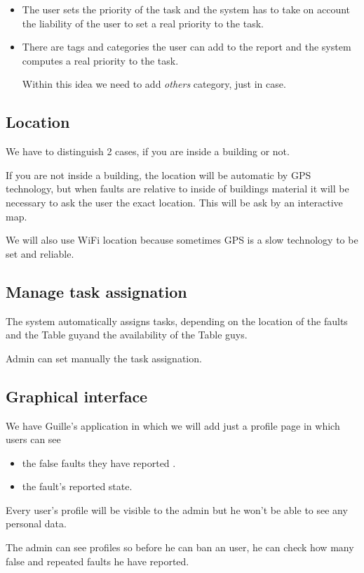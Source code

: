 \documentclass[nobuilddate,nochap]{apuntes}
\newcommand{\tbg}{Table guy}
\newcommand{\tbgs}{Table guys}
\begin{document}
\begin{itemize}
\item The user sets the priority of the task and the system has to take on account the liability of the user to set a real priority to the task. 

\item There are tags and categories the user can add to the report and the system computes a real priority to the task. 

Within this idea we need to add \textit{others} category, just in case.
\end{itemize}

\subsection{Location}

We have to distinguish 2 cases, if you are inside a building or not.

If you are not inside a building, the location will be automatic by GPS technology, but when faults are relative to inside of buildings material it will be necessary to ask the user the exact location. This will be ask by an interactive map. 


We will also use WiFi location because sometimes GPS is a slow technology to be set and reliable.

\subsection{Manage task assignation}
The system automatically assigns tasks, depending on the location of the faults and the \tbg and the availability of the \tbgs.

Admin can set manually the task assignation.

\subsection{Graphical interface}
We have Guille's application in which we will add just a profile page in which users can see 
\begin{itemize}
\item the false faults they have reported .
\item the fault's reported state.
\end{itemize}

Every user's profile will be visible to the admin but he won't be able to see any personal data. 

The admin can see profiles so before he can ban an user, he can check how many false and repeated faults he have reported.
\end{document}
